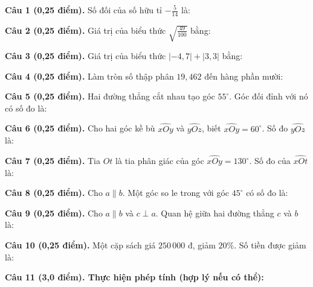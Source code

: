 \documentclass[12pt,a4paper]{article}
\begin{document}
\noindent\textbf{Câu 1 (0,25 điểm).} Số đối của số hữu tỉ $-\frac{5}{14}$ là: \par\vspace{2.4mm}
\noindent\textbf{Câu 2 (0,25 điểm).} Giá trị của biểu thức $\sqrt{\frac{49}{100}}$ bằng: \par\vspace{2.4mm}
\noindent\textbf{Câu 3 (0,25 điểm).} Giá trị của biểu thức $|-4{,}7| + |3{,}3|$ bằng: \par\vspace{2.4mm}
\noindent\textbf{Câu 4 (0,25 điểm).} Làm tròn số thập phân $19{,}462$ đến hàng phần mười: \par\vspace{2.4mm}
\noindent\textbf{Câu 5 (0,25 điểm).} Hai đường thẳng cắt nhau tạo góc $55^\circ$. Góc đối đỉnh với nó có số đo là: \par\vspace{2.4mm}
\noindent\textbf{Câu 6 (0,25 điểm).} Cho hai góc kề bù $\widehat{xOy}$ và $\widehat{yOz}$, biết $\widehat{xOy} = 60^\circ$. Số đo $\widehat{yOz}$ là: \par\vspace{2.4mm}
\noindent\textbf{Câu 7 (0,25 điểm).} Tia $Ot$ là tia phân giác của góc $\widehat{xOy} = 130^\circ$. Số đo của $\widehat{xOt}$ là: \par\vspace{2.4mm}
\noindent\textbf{Câu 8 (0,25 điểm).} Cho $a \parallel b$. Một góc so le trong với góc $45^\circ$ có số đo là: \par\vspace{2.4mm}
\noindent\textbf{Câu 9 (0,25 điểm).} Cho $a \parallel b$ và $c \perp a$. Quan hệ giữa hai đường thẳng $c$ và $b$ là: \par\vspace{2.4mm}
\noindent\textbf{Câu 10 (0,25 điểm).} Một cặp sách giá $250\,000$ đ, giảm $20\%$. Số tiền được giảm là: \par\vspace{2.4mm}
\vspace{0.4mm}

\noindent\textbf{Câu 11 (3,0 điểm). Thực hiện phép tính (hợp lý nếu có thể):}
\vspace{0.8mm}
\end{document}
